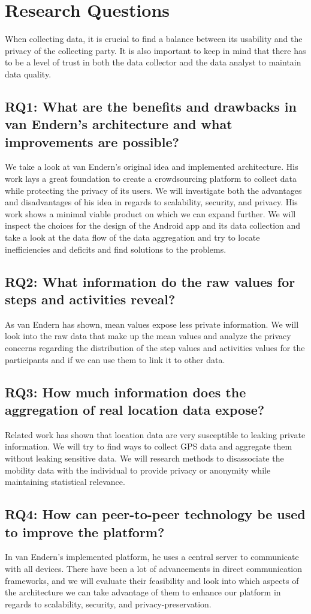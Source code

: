 \section{Research Questions}
When collecting data, it is crucial to find a balance between its usability and the privacy of the collecting party. It is also important to keep in mind that there has to be a level of trust in both the data collector and the data analyst to maintain data quality.
\subsection*{RQ1: What are the benefits and drawbacks in van Endern's architecture and what improvements are possible?}
We take a look at van Endern's original idea and implemented architecture. His work lays a great foundation to create a crowdsourcing platform to collect data while protecting the privacy of its users. We will investigate both the advantages and disadvantages of his idea in regards to scalability, security, and privacy. His work shows a minimal viable product on which we can expand further. We will inspect the choices for the design of the Android app and its data collection and take a look at the data flow of the data aggregation and try to locate inefficiencies and deficits and find solutions to the problems.
\subsection*{RQ2: What information do the raw values for steps and activities reveal?}
As van Endern has shown, mean values expose less private information. We will look into the raw data that make up the mean values and analyze the privacy concerns regarding the distribution of the step values and activities values for the participants and if we can use them to link it to other data.
\subsection*{RQ3: How much information does the aggregation of real location data expose?}
Related work 
has shown that location data are very susceptible to leaking private information. We will try to find ways to collect GPS data and aggregate them without leaking sensitive data. We will research methods to disassociate the mobility data with the individual to provide privacy or anonymity while maintaining statistical relevance.
\subsection*{RQ4: How can peer-to-peer technology be used to improve the platform?}
In van Endern's implemented platform, he uses a central server to communicate with all devices. There have been a lot of advancements in direct communication frameworks, and we will evaluate their feasibility and look into which aspects of the architecture we can take advantage of them to enhance our platform in regards to scalability, security, and privacy-preservation.

